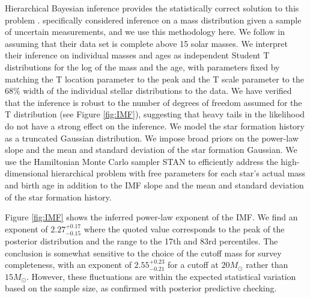 \documentclass[apjl]{emulateapj}
\newcommand{\onesigrange}[3]{\ensuremath{#1^{+#2}_{-#3}}}
\newcommand{\alpharange}{\onesigrange{2.27}{0.17}{0.15}}
\newcommand{\alpharangeHM}{\onesigrange{2.55}{0.23}{0.21}}
\begin{document}
Hierarchical Bayesian inference provides the statistically correct solution to
this problem \cite{Hogg:2010}.  \citet{Mandel:2010stat} specifically considered
inference on a mass distribution given a sample of uncertain measurements, and
we use this methodology here.  We follow \citet{Schneider:2018} in assuming that
their data set is complete above 15 solar masses.  We interpret their inference
on individual masses and ages as independent Student T distributions for the log
of the mass and the age, with parameters fixed by matching the T location
parameter to the peak and the T scale parameter to the 68\% width of the
individual stellar distributions to the \citet{Schneider:2018} data.  We have
verified that the inference is robust to the number of degrees of freedom
assumed for the T distribution (see Figure \ref{fig:IMF}), suggesting that heavy
tails in the likelihood do not have a strong effect on the inference. We model
the star formation history as a truncated Gaussian distribution.  We impose
broad priors on the power-law slope and the mean and standard deviation of the
star formation Gaussian.    We use the Hamiltonian Monte Carlo sampler STAN
\citep{STAN} to efficiently address the high-dimensional hierarchical problem
with free parameters for each star's actual mass and birth age in addition to
the IMF slope and the mean and standard deviation of the star formation history.

Figure \ref{fig:IMF} shows the inferred power-law exponent of the IMF.  We find
an exponent of $\alpharange$ where the quoted value corresponds to the peak of
the posterior distribution and the range to the 17th and 83rd percentiles.  The
conclusion is somewhat sensitive to the choice of the cutoff mass for survey
completeness, with an exponent of $\alpharangeHM$ for a cutoff at $20 M_\odot$
rather than $15 M_\odot$.  However, these fluctuations are within the expected
statistical variation based on the sample size, as confirmed with posterior
predictive checking.
\end{document}

